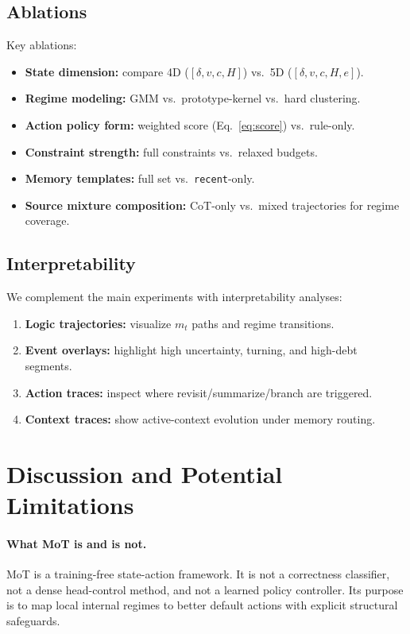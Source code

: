 \documentclass{article}
\begin{document}
\subsection{Ablations}
Key ablations:
\begin{itemize}[leftmargin=1.3em, itemsep=0.2em]
    \item \textbf{State dimension:} compare 4D ($[\delta,v,c,H]$) vs.\ 5D ($[\delta,v,c,H,e]$).
    \item \textbf{Regime modeling:} GMM vs.\ prototype-kernel vs.\ hard clustering.
    \item \textbf{Action policy form:} weighted score (Eq.~\eqref{eq:score}) vs.\ rule-only.
    \item \textbf{Constraint strength:} full constraints vs.\ relaxed budgets.
    \item \textbf{Memory templates:} full set vs.\ \texttt{recent}-only.
    \item \textbf{Source mixture composition:} CoT-only vs.\ mixed trajectories for regime coverage.
\end{itemize}

\subsection{Interpretability}
We complement the main experiments with interpretability analyses:
\begin{enumerate}[leftmargin=1.3em, itemsep=0.2em]
    \item \textbf{Logic trajectories:} visualize $m_t$ paths and regime transitions.
    \item \textbf{Event overlays:} highlight high uncertainty, turning, and high-debt segments.
    \item \textbf{Action traces:} inspect where revisit/summarize/branch are triggered.
    \item \textbf{Context traces:} show active-context evolution under memory routing.
\end{enumerate}


\section{Discussion and Potential Limitations}
\label{sec:discussion}

\paragraph{What MoT is and is not.}
MoT is a training-free state-action framework. It is not a correctness classifier, not a dense head-control method, and not a learned policy controller. Its purpose is to map local internal regimes to better default actions with explicit structural safeguards.
\end{document}
